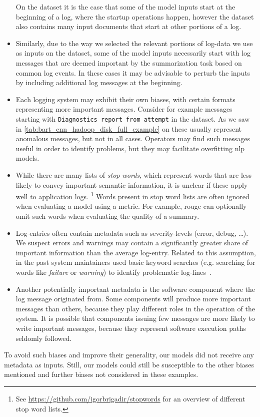 \begin{itemize}
      On the \hadoop{} dataset it is the case that some of the model inputs start at the beginning of a log,
      where the startup operations happen,
      however the dataset also contains many input documents that start at other portions of a log.
\item Similarly, due to the way we selected the relevant portions of log-data we use as inputs on the \telco{} dataset,
      some of the model inputs necessarily start with log messages that are deemed important by the summarization task based on common log events.
      In these cases it may be advisable to perturb the inputs by including additional log messages at the beginning.
\item Each logging system may exhibit their own biases, with certain formats representing more important messages.
      Consider for example messages starting with \texttt{Diagnostics report from attempt} in the \hadoop{} dataset.
      As we saw in \autoref{tab:bart_cnn_hadoop_disk_full_example} on  these usually represent anomalous messages,
      but not in all cases.
      Operators may find such messages useful in order to identify problems, but they may facilitate overfitting \ac{nlp} models.
\item While there are many lists of \emph{stop words}, which represent words that are less likely to convey important semantic information,
      it is unclear if these apply well to application logs.%
      \footnote{See \url{https://github.com/igorbrigadir/stopwords} for an overview of different stop word lists.}
      Words present in stop word lists are often ignored when evaluating a model using a metric.
      For example, \acs*{rouge} can optionally omit such words when evaluating the quality of a summary.
\item Log-entries often contain metadata such as severity-levels (error, debug, \ldots).
      We suspect errors and warnings may contain a significantly greater share of important information than the average log-entry.
      Related to this assumption, in the past system maintainers used basic keyword searches
      (e.g. searching for words like \emph{failure} or \emph{warning})
      to identify problematic log-lines~\parencite[307-308]{not_basic_keyword_search}.
\item Another potentially important metadata is the software component where the log message originated from.
      Some components will produce more important messages than others,
      because they play different roles in the operation of the system.
      It is possible that components issuing few messages are more likely to write important messages,
      because they represent software execution paths seldomly followed.
\end{itemize}
To avoid such biases and improve their generality, our models did not receive any metadata as inputs.
Still, our models could still be susceptible to the other biases mentioned and further biases not considered in these examples.

